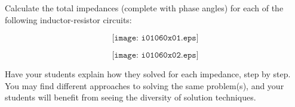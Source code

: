 

Calculate the total impedances (complete with phase angles) for each of the following inductor-resistor circuits:

$$\texttt{[image: i01060x01.eps]}$$







$$\texttt{[image: i01060x02.eps]}$$







Have your students explain how they solved for each impedance, step by step.  You may find different approaches to solving the same problem(s), and your students will benefit from seeing the diversity of solution techniques.




